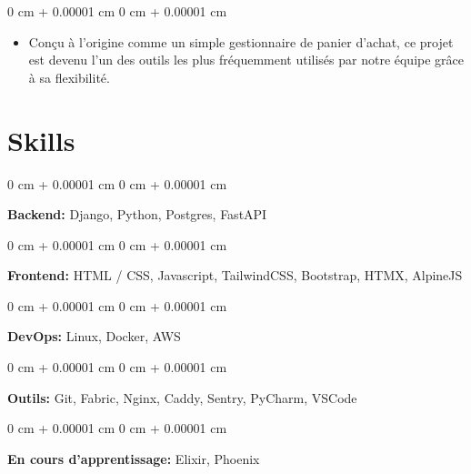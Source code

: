 \documentclass[10pt, letterpaper]{article}
\newenvironment{highlights}{
    \begin{itemize}[
        topsep=0.10 cm,
        parsep=0.10 cm,
        partopsep=0pt,
        itemsep=0pt,
        leftmargin=0 cm + 10pt
    ]
}{
    \end{itemize}
} %
\newenvironment{onecolentry}{
    \begin{adjustwidth}{
        0 cm + 0.00001 cm
    }{
        0 cm + 0.00001 cm
    }
}{
    \end{adjustwidth}
} %
\begin{document}
        \vspace{0.10 cm}
        \begin{onecolentry}
            \begin{highlights}
                \item Conçu à l'origine comme un simple gestionnaire de panier d'achat, ce projet est devenu l'un des outils les plus fréquemment utilisés par notre équipe grâce à sa flexibilité.
            \end{highlights}
        \end{onecolentry}



    
    \section{Skills}



        
        \begin{onecolentry}
            \textbf{Backend:} Django, Python, Postgres, FastAPI
        \end{onecolentry}

        \vspace{0.2 cm}

        \begin{onecolentry}
            \textbf{Frontend:} HTML / CSS, Javascript, TailwindCSS, Bootstrap, HTMX, AlpineJS
        \end{onecolentry}

        \vspace{0.2 cm}

        \begin{onecolentry}
            \textbf{DevOps:} Linux, Docker, AWS
        \end{onecolentry}

        \vspace{0.2 cm}

        \begin{onecolentry}
            \textbf{Outils:} Git, Fabric, Nginx, Caddy, Sentry, PyCharm, VSCode
        \end{onecolentry}

        \vspace{0.2 cm}

        \begin{onecolentry}
            \textbf{En cours d'apprentissage:} Elixir, Phoenix
        \end{onecolentry}
\end{document}
